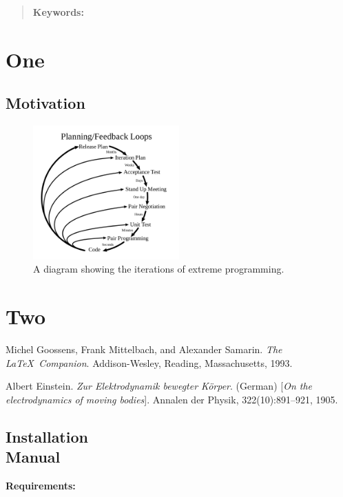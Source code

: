 \documentclass[12pt, a4paper, twoside]{article}
\begin{document}


\newpage

\begin{abstract}
    \blindtext[2]

	\bfseries{\large{Keywords:}}
\end{abstract}

\tableofcontents

\section{One \\}

\subsection{Motivation}
    \blindtext[2]
    
    \begin{figure}[h]
      \centering
        \includegraphics[width=0.5\textwidth]{xp}
      \caption{A diagram showing the iterations of extreme programming.}
    \end{figure}
    
    \blindtext[4]

\section{Two \\}
    \blindmathpaper

\begin{thebibliography}{9}
    Michel Goossens, Frank Mittelbach, and Alexander Samarin. 
    \textit{The \LaTeX\ Companion}. 
    Addison-Wesley, Reading, Massachusetts, 1993.
    
    Albert Einstein. 
    \textit{Zur Elektrodynamik bewegter K{\"o}rper}. (German) 
    [\textit{On the electrodynamics of moving bodies}]. 
    Annalen der Physik, 322(10):891–921, 1905.
\end{thebibliography}

\newpage

\begin{umaappendices}
\section{Installation \\ Manual}
    
    \textbf{\large{Requirements:}}
    
    \blindtext

\end{umaappendices}
\end{document}
